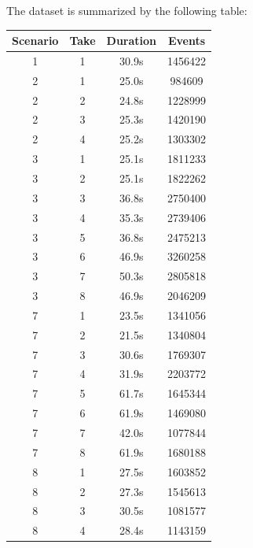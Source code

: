 The dataset is summarized by the following table:\\
\begin{center}
\begin{tabular}{ c  c  c  c  }
	Scenario & Take & Duration & Events\\
	\hline	
	\hline	
	1 & 1 & 30.9s & 1456422\\
	2 & 1 & 25.0s & 984609\\
	2 & 2 & 24.8s & 1228999\\
	2 & 3 & 25.3s & 1420190\\
	2 & 4 & 25.2s & 1303302\\
	3 & 1 & 25.1s & 1811233\\
	3 & 2 & 25.1s & 1822262\\
	3 & 3 & 36.8s & 2750400\\
	3 & 4 & 35.3s & 2739406\\
	3 & 5 & 36.8s & 2475213\\
	3 & 6 & 46.9s & 3260258\\
	3 & 7 & 50.3s & 2805818\\
	3 & 8 & 46.9s & 2046209\\
	7 & 1 & 23.5s & 1341056\\
	7 & 2 & 21.5s & 1340804\\
	7 & 3 & 30.6s & 1769307\\
	7 & 4 & 31.9s & 2203772\\
	7 & 5 & 61.7s & 1645344\\
	7 & 6 & 61.9s & 1469080\\
	7 & 7 & 42.0s & 1077844\\
	7 & 8 & 61.9s & 1680188\\
	8 & 1 & 27.5s & 1603852\\
	8 & 2 & 27.3s & 1545613\\
	8 & 3 & 30.5s & 1081577\\
	8 & 4 & 28.4s & 1143159\\                     
\end{tabular}
\end{center}



